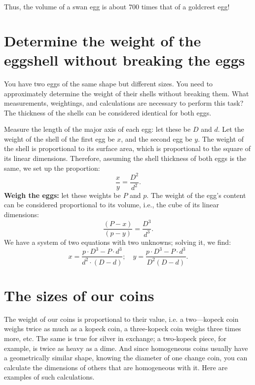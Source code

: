 Thus, the volume of a swan egg is about 700 times that of a goldcrest egg!

\section[Weight of the eggshell]{Determine the weight of the eggshell without breaking the eggs}
\label{sec-11.9}


\ques You have two eggs of the same shape but different sizes. You need to approximately determine the weight of their shells without breaking them. What measurements, weightings, and calculations are necessary to perform this task? The thickness of the shells can be considered identical for both eggs.



\ans Measure the length of the major axis of each egg: let these be \( D \) and \( d \). Let the weight of the shell of the first egg be \( x \), and the second egg be \( y \). The weight of the shell is proportional to its surface area, which is proportional to the square of its linear dimensions. Therefore, assuming the shell thickness of both eggs is the same, we set up the proportion:
\begin{equation*}%
\frac{x}{y} = \frac{D^2}{d^2}.
\end{equation*}
\textbf{Weigh the eggs:} let these weights be \( P \) and \( p \). The weight of the egg's content can be considered proportional to its volume, i.e., the cube of its linear dimensions:
\begin{equation*}%
\frac{(P - x)}{(p - y)} = \frac{D^3}{d^3}.
\end{equation*}
We have a system of two equations with two unknowns; solving it, we find:
\begin{equation*}%
x = \frac{p \cdot D^3 - P \cdot d^3}{d^2 \cdot (D - d)}; \quad
y = \frac{p \cdot D^3 - P \cdot d^3}{D^2 (D - d)}.
\end{equation*}


\section{The sizes of our coins}
\label{sec-11.10}

The weight of our coins is proportional to their value, i.e. a two—kopeck coin weighs twice as much as a kopeck coin, a three-kopeck coin weighs three times more, etc. The same is true for silver in exchange; a two-kopeck piece, for example, is twice as heavy as a dime. And since homogeneous coins usually have a geometrically similar shape, knowing the diameter of one change coin, you can calculate the dimensions of others that are homogeneous with it. Here are examples of such calculations.

